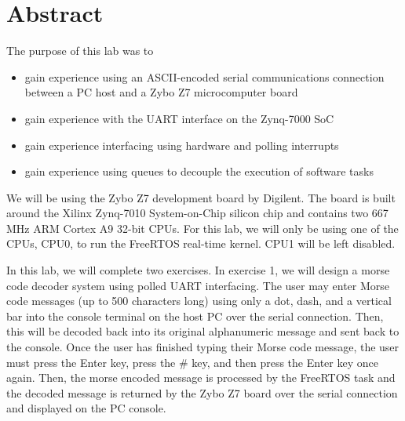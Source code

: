 \documentclass[11pt, letterpaper, titlepage]{article}
\title{\textbf{\Huge{ 
\begin{center}
ECE 315 Lab 2%
\end{center} 
}}}
\author{Lora Ma \\ Benjamin Kong \\ \\ECE 315 Lab Section H41}
\begin{document}
\maketitle

\thispagestyle{empty}
\tableofcontents 
\newpage
{}

\section{Abstract}
The purpose of this lab was to
\begin{itemize}
  \item gain experience using an ASCII-encoded serial communications connection between a PC host and a Zybo Z7 microcomputer board
  \item gain experience with the UART interface on the Zynq-7000 SoC
  \item gain experience interfacing using hardware and polling interrupts
  \item gain experience using queues to decouple the execution of software tasks
\end{itemize}

We will be using the Zybo Z7 development board by Digilent. The board is built
around the Xilinx Zynq-7010 System-on-Chip silicon chip and contains two 667 MHz ARM
Cortex A9 32-bit CPUs. For this lab, we will only be using one of the CPUs, CPU0, to run the FreeRTOS real-time kernel. CPU1 will be left disabled. 

In this lab, we will complete two exercises. In exercise 1, we will design a morse code decoder system using polled UART interfacing. The user may enter Morse code messages (up to 500 characters long) using only a dot, dash, and a vertical bar into the console terminal on the host PC over the serial connection. Then, this will be decoded back into its original alphanumeric message and sent back to the console. Once the user has finished typing their Morse code message, the user must press the Enter key, press the \# key, and then press the Enter key once again. Then, the morse encoded message is processed by the FreeRTOS task and the decoded message is returned by the Zybo Z7 board over the serial connection and displayed on the PC console. 
\end{document}
